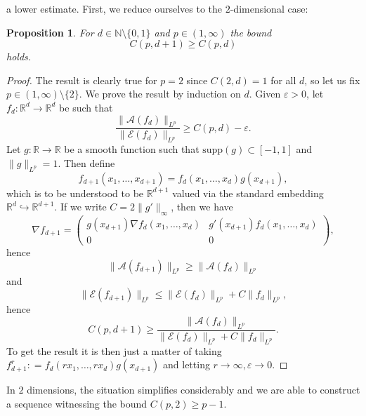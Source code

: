\documentclass[11pt, a4paper]{amsart}
\newtheorem{proposition}{Proposition}[section]
\theoremstyle{definition}
\theoremstyle{remark}
\newcommand{\R}{\mathbb{R}}
\newcommand{\N}{\mathbb{N}}
\begin{document}
a lower estimate. First, we reduce ourselves
to the $2$-dimensional case:
\begin{proposition}\label{prop:monotonedim}
For $d\in \N\setminus\{0,1\}$
and $p\in (1,\infty)$ the bound
\begin{equation*}
C(p,d+1)\ge C(p,d)
\end{equation*}
holds.
\end{proposition}
\begin{proof}
The result is clearly true for $p=2$
since $C(2,d)=1$ for all $d$,
so let us fix $p\in (1,\infty)\setminus \{2\}$.
We prove the result by induction on $d$.
Given $\varepsilon>0$,
let $f_{d}\colon\R^d\to \R^d$ be such that
\begin{equation*}
\frac{\|\mathcal A(f_d)\|_{L^p}}
{\|\mathcal E(f_d)\|_{L^p}}
\ge C(p,d)-\varepsilon.
\end{equation*}
Let $g\colon \R\to \R$ be a smooth function
such that $\text{supp}(g)\subset [-1,1]$
and $\|g\|_{L^p}=1$.
Then define 
\begin{equation*}
f_{d+1}(x_1,\dots, x_{d+1})=f_d(x_1,\dots, x_d)
g(x_{d+1}),
\end{equation*}
which is to be understood to be $\R^{d+1}$ valued via
the standard embedding $\R^d\hookrightarrow \R^{d+1}$.
If we write $C=2\|g'\|_{\infty}$, then we have
\begin{equation*}
\nabla f_{d+1}=
\begin{pmatrix}
g(x_{d+1})\nabla f_d(x_1,\dots, x_d)&
g'(x_{d+1})f_d(x_1,\dots,x_d)\\
0&0
\end{pmatrix},
\end{equation*}
hence 
\begin{equation*}
\|\mathcal A(f_{d+1})\|_{L^p}
\ge \|\mathcal A(f_d)\|_{L^p}
\end{equation*}
and
\begin{equation*}
\|\mathcal E(f_{d+1})\|_{L^p}
\le \|\mathcal E(f_d)\|_{L^p}+C\|f_d\|_{L^p},
\end{equation*}
hence
\begin{equation*}
C(p,d+1)\ge \frac{\|\mathcal A(f_d)\|_{L^p}}
{\|\mathcal E(f_d)\|_{L^p}+
C\|f_d\|_{L^p}}.
\end{equation*}
To get the result it is then just a matter of
taking $f_{d+1}^r\mathrel{:}=
f_d(rx_1,\dots, rx_d)g(x_{d+1})$
and letting $r\to \infty, \varepsilon\to 0$.
\end{proof}
In $2$ dimensions, the situation simplifies
considerably and we are
able to construct a sequence witnessing
the bound $C(p,2)\ge p-1$.
\end{document}
